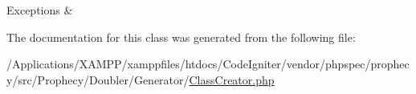 \begin{DoxyExceptions}{Exceptions}
{\em } & \\
\hline
\end{DoxyExceptions}


The documentation for this class was generated from the following file\+:\begin{DoxyCompactItemize}
\item 
/\+Applications/\+X\+A\+M\+P\+P/xamppfiles/htdocs/\+Code\+Igniter/vendor/phpspec/prophecy/src/\+Prophecy/\+Doubler/\+Generator/\mbox{\hyperlink{_class_creator_8php}{Class\+Creator.\+php}}\end{DoxyCompactItemize}
